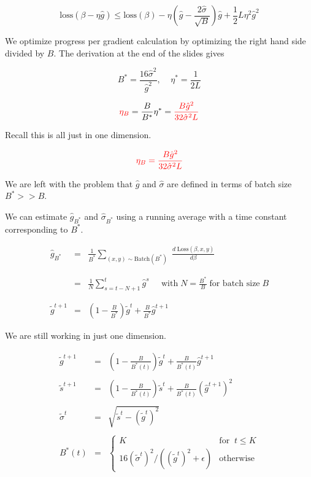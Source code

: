 {{

$$\mathrm{loss}(\beta - \eta\hat{g}) \leq \mathrm{loss}(\beta) - \eta \left(\hat{g} - \frac{2\hat{\sigma}}{\sqrt{B}} \right)\hat{g}  + \frac{1}{2}L \eta^2 \hat{g}^2$$

\vfill
We optimize progress per gradient calculation by optimizing the right hand side divided by $B$.  The derivation at the end of the slides gives

\vfill
$$B^*  =  \frac{16\hat{\sigma}^2}{\hat{g}^2},\;\;\;\;\eta^*  =  \frac{1}{2L}$$

\vfill
$${\color{red} \eta_B} = \frac{B}{B^*} \eta^* = {\color{red} \frac{B \hat{g}^2}{32\hat{\sigma}^2L}}$$

\vfill
Recall this is all just in one dimension.


$${\color{red} \eta_B = \frac{B \hat{g}^2}{32\hat{\sigma}^2L}}$$

\vfill
We are left with the problem that $\hat{g}$ and $\hat{\sigma}$ are defined in terms of batch size $B^* >> B$.

\vfill
We can estimate $\hat{g}_{B^*}$ and $\hat{\sigma}_{B^*}$ using a running average with a time constant corresponding to $B^*$.


\begin{eqnarray*}
  \hat{g}_{B^*} & = & \frac{1}{B^*} \sum_{(x,y) \sim \mathrm{Batch}(B^*)}\; \frac{d\;\mathrm{Loss}(\beta,x,y)}{d\beta} \\
  \\
  \\
  & = & \frac{1}{N} \sum_{s=t-N+1}^t \hat{g}^s\;\;\;\;\;\mbox{with}\;N= \frac{B^*}{B} \;\mbox{for batch size}\;B \\
  \\
  \\
  \tilde{g}^{t+1} & = & \left(1-\frac{B}{B^*}\right)\tilde{g}^t + \frac{B}{B^*} \hat{g}^{t+1}
\end{eqnarray*}

\vfill
We are still working in just one dimension.

\begin{eqnarray*}
  \tilde{g}^{t+1} & = & \left(1-\frac{B}{B^*(t)}\right)\tilde{g}^t + \frac{B}{B^*(t)} \hat{g}^{t+1} \\
  \\
  \tilde{s}^{t+1} & = & \left(1-\frac{B}{B^*(t)}\right)\tilde{s}^t + \frac{B}{B^*(t)} (\hat{g}^{t+1})^2 \\
  \\
  \tilde{\sigma}^t & = & \sqrt{\tilde{s}^t - (\tilde{g}^t)^2} \\
  \\
  B^*(t) &= & \left\{\begin{array}{ll} K & \mbox{for}\;\; t \leq K \\
  16(\tilde{\sigma}^t)^2/((\tilde{g}^t)^2 + \epsilon) & \mbox{otherwise} \end{array}\right.
\end{eqnarray*}

}}
